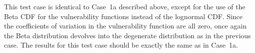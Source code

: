 This test case is identical to Case~1a described above, except for the use of the Beta CDF for the vulnerability functions instead of the lognormal CDF. Since the coefficients of variation in the vulnerability function are all zero, once again the Beta distribution devolves into the degenerate distribution as in the previous case. The results for this test case should be exactly the same as in Case~1a.
